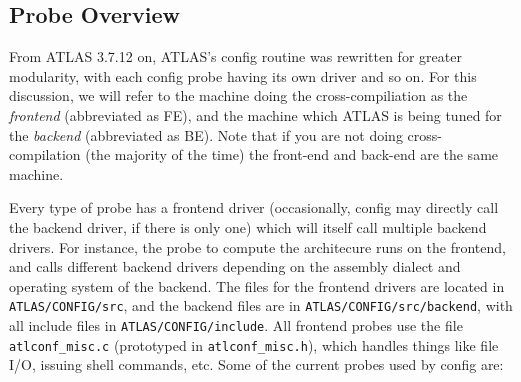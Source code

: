 \documentclass[11pt]{article}
\begin{document}
\subsection{Probe Overview}
From ATLAS 3.7.12 on, ATLAS's config routine was rewritten for greater
modularity, with each config probe having its own driver and so on.
For this discussion, we will refer to the machine doing the cross-compiliation
as the {\it frontend} (abbreviated as FE), and the machine which ATLAS is
being tuned for the {\it backend} (abbreviated as BE).  Note that if you are
not doing cross-compilation (the majority of the time) the front-end and
back-end are the same machine.


Every type of probe has a frontend driver (occasionally, config may directly
call the backend driver, if there is only one) which will itself call
multiple backend drivers.  
For instance, the probe to compute the architecure runs on the frontend, and
calls different backend drivers depending on the assembly dialect and operating
system of the backend.
The files for the frontend drivers are located in
{\tt ATLAS/CONFIG/src}, and the backend files are in 
{\tt ATLAS/CONFIG/src/backend}, with all include files in 
{\tt ATLAS/CONFIG/include}.  All frontend probes use the file 
{\tt atlconf\_misc.c} (prototyped in {\tt atlconf\_misc.h}), 
which handles things like file I/O, issuing shell commands, etc.  
Some of the current probes used by config are:
\end{document}
